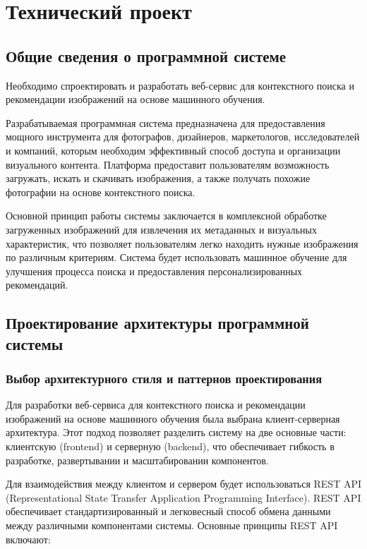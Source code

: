 \newsection
\section{Технический проект}
\subsection{Общие сведения о программной системе}

Необходимо спроектировать и разработать веб-сервис для контекстного поиска и рекомендации изображений на основе машинного обучения.

Разрабатываемая программная система предназначена для предоставления мощного инструмента для фотографов, дизайнеров, маркетологов, исследователей и компаний, которым необходим эффективный способ доступа и организации визуального контента. Платформа предоставит пользователям возможность загружать, искать и скачивать изображения, а также получать похожие фотографии на основе контекстного поиска.

Основной принцип работы системы заключается в комплексной обработке загруженных изображений для извлечения их метаданных и визуальных характеристик, что позволяет пользователям легко находить нужные изображения по различным критериям. Система будет использовать машинное обучение для улучшения процесса поиска и предоставления персонализированных рекомендаций.

\subsection{Проектирование архитектуры программной системы}
\subsubsection{Выбор архитектурного стиля и паттернов проектирования}

Для разработки веб-сервиса для контекстного поиска и рекомендации изображений на основе машинного обучения была выбрана клиент-серверная архитектура. Этот подход позволяет разделить систему на две основные части: клиентскую (frontend) и серверную (backend), что обеспечивает гибкость в разработке, развертывании и масштабировании компонентов.

Для взаимодействия между клиентом и сервером будет использоваться REST API (Representational State Transfer Application Programming Interface). REST API обеспечивает стандартизированный и легковесный способ обмена данными между различными компонентами системы. Основные принципы REST API включают:

